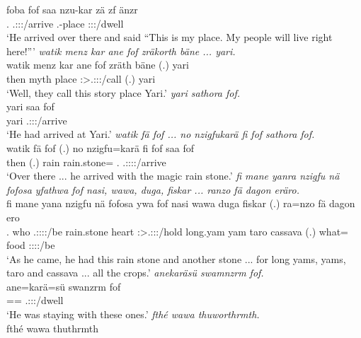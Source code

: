 \begin{exe}
	\gll foba fof saa nzu-kar zä zf änzr\\ 
	\Dist.\Abl{} \Emph{} \Tsg.\Masc:\Sbj:\Pst:\Pfv/arrive \Fsg.\Poss-place \Prox{} \Imm{} \Stpl:\Sbj:\Nonpast:\Ipfv/dwell\\
	\trans `He arrived over there and said ``This is my place. My people will live right here!'''
	\emph{watik menz kar ane fof zräkorth bäne ... yari.}\\
	\gll watik menz kar ane fof zräth bäne (.) yari\\ 
	then myth place \Dem{} \Emph{} \Stpl:\Sbj>\Tsg.\F:\Obj:\Irr:\Pfv/call \Recog{} (.) yari\\
	\trans `Well, they call this story place Yari.'
	\emph{yari sathora fof.}\\
	\gll yari saa fof\\ 
	yari \Tsg.\Masc:\Sbj:\Pst:\Pfv/arrive \Emph{}\\
	\trans `He had arrived at Yari.'
	\emph{watik fä fof ... no nzigfukarä fi fof sathora fof.}\\
	\gll watik fä fof (.) no nzigfu=karä fi fof saa fof\\ 
	then \Dist{} \Emph{} (.) rain rain.stone=\Prop{} \Third.\Abs{} \Emph{} \Tsg.\Masc:\Sbj:\Pst:\Pfv:\Venit/arrive \Emph{}\\
	\trans `Over there ... he arrived with the magic rain stone.'
	\emph{fi mane yanra nzigfu nä fofosa yfathwa fof nasi, wawa, duga, fiskar ... ranzo fä dagon eräro.}\\
	\gll fi mane yana nzigfu nä fofosa ywa fof nasi wawa duga fiskar (.) ra=nzo fä dagon ero\\ 
	\Third.\Abs{} who \Tsg.\Masc:\Sbj:\Pst:\Ipfv:\Venit/be rain.stone \Indf{} heart \Sg:\Sbj>\Tsg.\Masc:\Obj:\Pst:\Ipfv/hold \Emph{} long.yam yam taro cassava (.) what=\Only{} \Dist{} food \Stpl:\Sbj:\Nonpast:\Ipfv:\Andat/be\\
	\trans `As he came, he had this rain stone and another stone ... for long yams, yams, taro and cassava ... all the crops.'
	\emph{anekaräsü swamnzrm fof.}\\
	\gll ane=karä=sü swanzrm fof\\ 
	\Dem=\Prop=\Etc{} \Tsg.\Masc:\Sbj:\Pst:\Dur/dwell \Emph{}\\
	\trans `He was staying with these ones.'
	\emph{fthé wawa thuworthrmth.}\\
	\gll fthé wawa thuthrmth\\ 

\end{exe}
